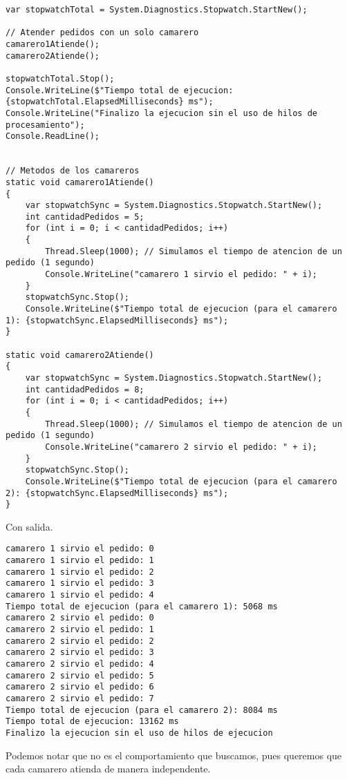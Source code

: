 \documentclass[executivepaper]{article}
\begin{document}
\begin{lstlisting}
var stopwatchTotal = System.Diagnostics.Stopwatch.StartNew();

// Atender pedidos con un solo camarero
camarero1Atiende();
camarero2Atiende();

stopwatchTotal.Stop();
Console.WriteLine($"Tiempo total de ejecucion: {stopwatchTotal.ElapsedMilliseconds} ms");
Console.WriteLine("Finalizo la ejecucion sin el uso de hilos de procesamiento");
Console.ReadLine();
    

// Metodos de los camareros
static void camarero1Atiende()
{
    var stopwatchSync = System.Diagnostics.Stopwatch.StartNew();
    int cantidadPedidos = 5;
    for (int i = 0; i < cantidadPedidos; i++)
    {
        Thread.Sleep(1000); // Simulamos el tiempo de atencion de un pedido (1 segundo)
        Console.WriteLine("camarero 1 sirvio el pedido: " + i);
    }
    stopwatchSync.Stop();
    Console.WriteLine($"Tiempo total de ejecucion (para el camarero 1): {stopwatchSync.ElapsedMilliseconds} ms");
}

static void camarero2Atiende()
{
    var stopwatchSync = System.Diagnostics.Stopwatch.StartNew();
    int cantidadPedidos = 8;
    for (int i = 0; i < cantidadPedidos; i++)
    {
        Thread.Sleep(1000); // Simulamos el tiempo de atencion de un pedido (1 segundo)
        Console.WriteLine("camarero 2 sirvio el pedido: " + i);
    }
    stopwatchSync.Stop();
    Console.WriteLine($"Tiempo total de ejecucion (para el camarero 2): {stopwatchSync.ElapsedMilliseconds} ms");
}
\end{lstlisting}

Con salida.

\begin{verbatim}
camarero 1 sirvio el pedido: 0
camarero 1 sirvio el pedido: 1
camarero 1 sirvio el pedido: 2
camarero 1 sirvio el pedido: 3
camarero 1 sirvio el pedido: 4
Tiempo total de ejecucion (para el camarero 1): 5068 ms
camarero 2 sirvio el pedido: 0
camarero 2 sirvio el pedido: 1
camarero 2 sirvio el pedido: 2
camarero 2 sirvio el pedido: 3
camarero 2 sirvio el pedido: 4
camarero 2 sirvio el pedido: 5
camarero 2 sirvio el pedido: 6
camarero 2 sirvio el pedido: 7
Tiempo total de ejecucion (para el camarero 2): 8084 ms
Tiempo total de ejecucion: 13162 ms
Finalizo la ejecucion sin el uso de hilos de ejecucion
\end{verbatim}

Podemos notar que no es el comportamiento que buscamos, pues queremos que cada camarero atienda de manera independente.
\end{document}
